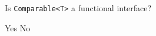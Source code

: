 \documentclass[addpoints,9pt]{exam}
\begin{document}
\begin{questions}



\question[3] Is {\tt Comparable<T>} a functional interface?

\begin{choices}
\correctchoice Yes
\choice No
\end{choices}











\end{questions}
\end{document}
